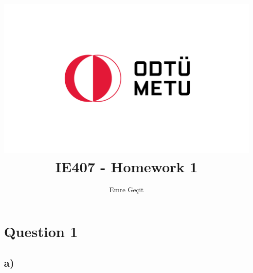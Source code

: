 \documentclass{article}
\author{Emre Geçit}
\title{\includegraphics{9.4.png}\\ IE407 - Homework 1}
\begin{document}
\maketitle

\section*{Question 1}
\subsection*{a)}
\end{document}
